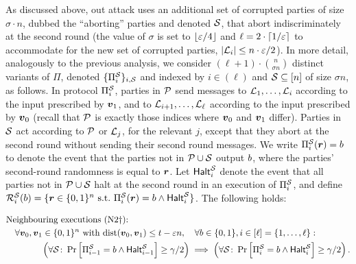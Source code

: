 As discussed above, out attack uses an additional set of corrupted parties of size $\sigma\cdot n$, dubbed the ``aborting'' parties and denoted $\mathcal{S}$, that abort indiscriminately at the second round (the value of $\sigma$ is set to $\lfloor \varepsilon/4 \rfloor$ and $\ell=2\cdot \lceil1/\varepsilon\rceil$ to accommodate for the new set of corrupted parties, \ie $\left|{\cal{L}}_i\right|\le n\cdot \varepsilon /2$). In more detail, analogously to the previous analysis, we consider $(\ell+1)\cdot \binom{n}{\sigma n}$ distinct variants of $\Pi$, denoted $\{\Pi^{\mathcal{S}}_i\}_{i,\mathcal{S}}$ and indexed by $i\in (\ell)$ and $\mathcal{S} \subseteq[n]$ of size $\sigma n$, as follows. In protocol $\Pi_i^{\mathcal{S}}$, parties in $\mathcal{P}$ send messages to ${\cal{L}}_1,\ldots, {\cal{L}}_i$ according to the input prescribed by ${ \boldsymbol{v}}_1$, and to ${\cal{L}}_{i+1},\ldots, {\cal{L}}_\ell$ according to the input prescribed by ${ \boldsymbol{v}}_0$ (recall that $\mathcal{P}$ is exactly those indices where ${ \boldsymbol{v}}_0$ and ${ \boldsymbol{v}}_1$ differ). Parties in $\mathcal{S}$ act according to $\mathcal{P}$ or ${\cal{L}}_j$, for the relevant $j$, except that they abort at the second round without sending their second round messages. We write $\Pi^{\mathcal{S}}_i({ \boldsymbol{r}})=b$ to denote the event that the parties not in $\mathcal{P}\cup \mathcal{S}$ output $b$, where the parties' second-round randomness is equal to ${ \boldsymbol{r}}$. Let $\mathsf{Halt}^{\mathcal{S}}_i$ denote the event that all parties not in $\mathcal{P}\cup \mathcal{S}$ halt at the second round in an execution of $\Pi^{\mathcal{S}}_i$, and define $\mathcal{R}_{i }^{\mathcal{S}}(b)=\{{ \boldsymbol{r}}\in {\{0,1\}^n}\text{ s.t.\ } \Pi^{\mathcal{S}}_i({ \boldsymbol{r}})=b \land \mathsf{Halt}^{\mathcal{S}}_i\}$. The following holds:

\begin{align}\label{eq:nei3}
&\text{Neighbouring executions (N2$\dagger$):}\\
&\quad \forall { \boldsymbol{v}}_0,{ \boldsymbol{v}}_1 \in {\{0,1\}^n}  \text{ with }  \mathrm{dist}({ \boldsymbol{v}}_0,{ \boldsymbol{v}}_1)\le t-\varepsilon n,   \quad  \forall   b\in \{0,1\},i\in  [\ell] = \left\{1,\ldots,\ell\right\}\colon\nonumber\\
&\qquad\qquad \left (\forall \mathcal{S}\colon \Pr_{}\left[\Pi^{\mathcal{S}}_{i-1}=b \land \mathsf{Halt}^{\mathcal{S}}_{i-1}\right]  \ge \gamma/2 \right)  \implies \left(\forall \mathcal{S}\colon\Pr_{}\left[\Pi^{\mathcal{S}}_{i}=b \land \mathsf{Halt}^{\mathcal{S}}_{i}\right]\ge \gamma/2\right). \nonumber
\end{align}

